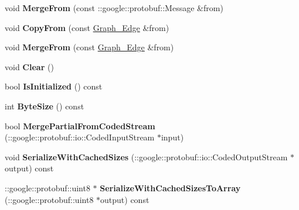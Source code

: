 \begin{DoxyCompactItemize}
\item 
\hypertarget{classgraph_1_1Graph__Edge_a21df881962677b6db77cd0fc6fdb8086}{
void {\bfseries MergeFrom} (const ::google::protobuf::Message \&from)}
\label{classgraph_1_1Graph__Edge_a21df881962677b6db77cd0fc6fdb8086}

\item 
\hypertarget{classgraph_1_1Graph__Edge_a70c9bb7cbaad6263cf5b67a61315daaf}{
void {\bfseries CopyFrom} (const \hyperlink{classgraph_1_1Graph__Edge}{Graph\_\-Edge} \&from)}
\label{classgraph_1_1Graph__Edge_a70c9bb7cbaad6263cf5b67a61315daaf}

\item 
\hypertarget{classgraph_1_1Graph__Edge_a9c6886542c53a31f42ae5ea9afa826c2}{
void {\bfseries MergeFrom} (const \hyperlink{classgraph_1_1Graph__Edge}{Graph\_\-Edge} \&from)}
\label{classgraph_1_1Graph__Edge_a9c6886542c53a31f42ae5ea9afa826c2}

\item 
\hypertarget{classgraph_1_1Graph__Edge_a2bbcc59dbf4e00c8f3007fa89b5470a9}{
void {\bfseries Clear} ()}
\label{classgraph_1_1Graph__Edge_a2bbcc59dbf4e00c8f3007fa89b5470a9}

\item 
\hypertarget{classgraph_1_1Graph__Edge_a9d94dfbfe951e8e834ccf837901c51dd}{
bool {\bfseries IsInitialized} () const }
\label{classgraph_1_1Graph__Edge_a9d94dfbfe951e8e834ccf837901c51dd}

\item 
\hypertarget{classgraph_1_1Graph__Edge_a76a24bfd2a4d0f0f79df2014bb4d184d}{
int {\bfseries ByteSize} () const }
\label{classgraph_1_1Graph__Edge_a76a24bfd2a4d0f0f79df2014bb4d184d}

\item 
\hypertarget{classgraph_1_1Graph__Edge_aed892b9333d734dde9a338fafa4ea497}{
bool {\bfseries MergePartialFromCodedStream} (::google::protobuf::io::CodedInputStream $\ast$input)}
\label{classgraph_1_1Graph__Edge_aed892b9333d734dde9a338fafa4ea497}

\item 
\hypertarget{classgraph_1_1Graph__Edge_a0f0582860901bfb055dda63c7193e7e3}{
void {\bfseries SerializeWithCachedSizes} (::google::protobuf::io::CodedOutputStream $\ast$output) const }
\label{classgraph_1_1Graph__Edge_a0f0582860901bfb055dda63c7193e7e3}

\item 
\hypertarget{classgraph_1_1Graph__Edge_a864e056928fefb48751ba22f97064d3f}{
::google::protobuf::uint8 $\ast$ {\bfseries SerializeWithCachedSizesToArray} (::google::protobuf::uint8 $\ast$output) const }
\label{classgraph_1_1Graph__Edge_a864e056928fefb48751ba22f97064d3f}


\end{DoxyCompactItemize}
